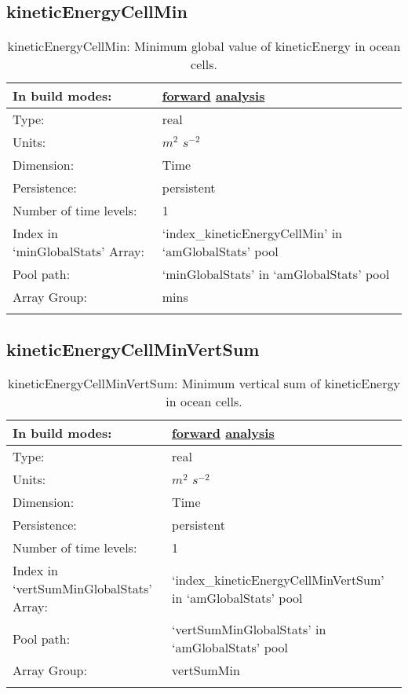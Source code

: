 \subsection[kineticEnergyCellMin]{kineticEnergyCellMin}
\label{subsec:var_sec_amGlobalStats_kineticEnergyCellMin}
\begin{center}
\begin{longtable}{| p{2.0in} | p{4.0in} |}
        \hline 
        In build modes: & \hyperref[subsec:forward_var_tab_amGlobalStats]{forward} \hyperref[subsec:analysis_var_tab_amGlobalStats]{analysis} \\
        \hline 
        Type: & real \\
        \hline 
        Units: & $m^2$ $s^{-2}$ \\
        \hline 
        Dimension: & Time \\
        \hline 
        Persistence: & persistent \\
        \hline 
        Number of time levels: & 1 \\
        \hline 
		 Index in `minGlobalStats' Array: & `index\_kineticEnergyCellMin' in `amGlobalStats' pool \\
		 \hline 
            Pool path: & `minGlobalStats' in `amGlobalStats' pool \\
		 \hline 
		 Array Group: & mins \\
		 \hline 
    \caption{kineticEnergyCellMin: Minimum global value of kineticEnergy in ocean cells.}
\end{longtable}
\end{center}
\subsection[kineticEnergyCellMinVertSum]{kineticEnergyCellMinVertSum}
\label{subsec:var_sec_amGlobalStats_kineticEnergyCellMinVertSum}
\begin{center}
\begin{longtable}{| p{2.0in} | p{4.0in} |}
        \hline 
        In build modes: & \hyperref[subsec:forward_var_tab_amGlobalStats]{forward} \hyperref[subsec:analysis_var_tab_amGlobalStats]{analysis} \\
        \hline 
        Type: & real \\
        \hline 
        Units: & $m^2$ $s^{-2}$ \\
        \hline 
        Dimension: & Time \\
        \hline 
        Persistence: & persistent \\
        \hline 
        Number of time levels: & 1 \\
        \hline 
		 Index in `vertSumMinGlobalStats' Array: & `index\_kineticEnergyCellMinVertSum' in `amGlobalStats' pool \\
		 \hline 
            Pool path: & `vertSumMinGlobalStats' in `amGlobalStats' pool \\
		 \hline 
		 Array Group: & vertSumMin \\
		 \hline 
    \caption{kineticEnergyCellMinVertSum: Minimum vertical sum of kineticEnergy in ocean cells.}
\end{longtable}
\end{center}
